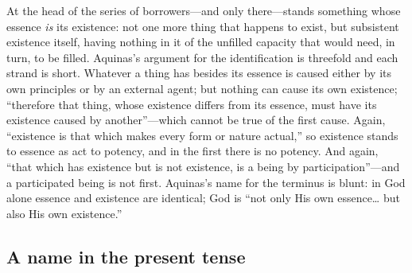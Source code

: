 At the head of the series of borrowers---and only there---stands something whose essence \emph{is} its existence: not one more thing that happens to exist, but subsistent existence itself, having nothing in it of the unfilled capacity that would need, in turn, to be filled. Aquinas's argument for the identification is threefold and each strand is short. Whatever a thing has besides its essence is caused either by its own principles or by an external agent; but nothing can cause its own existence; ``therefore that thing, whose existence differs from its essence, must have its existence caused by another''---which cannot be true of the first cause. Again, ``existence is that which makes every form or nature actual,'' so existence stands to essence as act to potency, and in the first there is no potency. And again, ``that which has existence but is not existence, is a being by participation''---and a participated being is not first. Aquinas's name for the terminus is blunt: in God alone essence and existence are identical; God is ``not only His own essence\ldots{} but also His own existence.''

\subsection{A name in the present tense}

